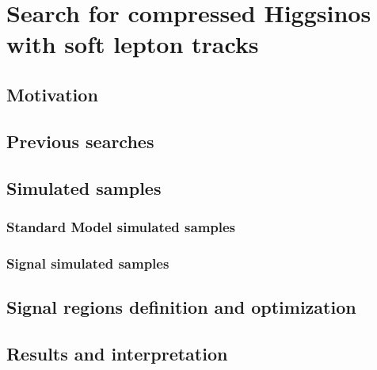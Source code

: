 \chapter{Search for compressed Higgsinos  with soft
lepton tracks}

\section{Motivation}

\section{Previous searches}




\section{Simulated samples}
\subsection{Standard Model simulated samples}
\label{sec:sm-mc}
\subsection{Signal simulated samples}
\label{sec:signal-simulation}









\clearpage
\section{Signal regions definition and optimization}
\label{sec:signal-regions}

\clearpage
\section{Results and interpretation}



